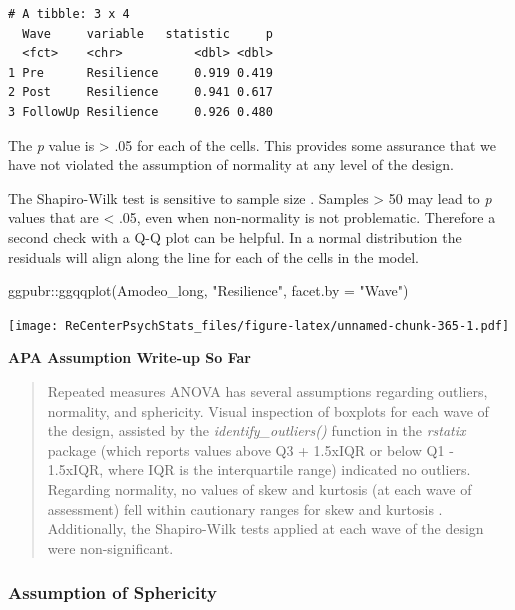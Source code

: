 \documentclass[
  11pt,
]{book}
\newenvironment{Shaded}{\begin{snugshade}}{\end{snugshade}}
\newcommand{\AttributeTok}[1]{\textcolor[rgb]{0.77,0.63,0.00}{#1}}
\newcommand{\FunctionTok}[1]{\textcolor[rgb]{0.00,0.00,0.00}{#1}}
\newcommand{\NormalTok}[1]{#1}
\newcommand{\SpecialCharTok}[1]{\textcolor[rgb]{0.00,0.00,0.00}{#1}}
\newcommand{\StringTok}[1]{\textcolor[rgb]{0.31,0.60,0.02}{#1}}
\begin{document}
\begin{verbatim}
# A tibble: 3 x 4
  Wave     variable   statistic     p
  <fct>    <chr>          <dbl> <dbl>
1 Pre      Resilience     0.919 0.419
2 Post     Resilience     0.941 0.617
3 FollowUp Resilience     0.926 0.480
\end{verbatim}

The \emph{p} value is \textgreater{} .05 for each of the cells. This provides some assurance that we have not violated the assumption of normality at any level of the design.

The Shapiro-Wilk test is sensitive to sample size \citep{datanovia_repeated_nodate}. Samples \textgreater{} 50 may lead to \emph{p} values that are \textless{} .05, even when non-normality is not problematic. Therefore a second check with a Q-Q plot can be helpful. In a normal distribution the residuals will align along the line for each of the cells in the model.

\begin{Shaded}
\begin{Highlighting}[]
\NormalTok{ggpubr}\SpecialCharTok{::}\FunctionTok{ggqqplot}\NormalTok{(Amodeo\_long, }\StringTok{"Resilience"}\NormalTok{, }\AttributeTok{facet.by =} \StringTok{"Wave"}\NormalTok{)}
\end{Highlighting}
\end{Shaded}

\texttt{[image: ReCenterPsychStats\_files/figure-latex/unnamed-chunk-365-1.pdf]}

\textbf{APA Assumption Write-up So Far}

\begin{quote}
Repeated measures ANOVA has several assumptions regarding outliers, normality, and sphericity. Visual inspection of boxplots for each wave of the design, assisted by the \emph{identify\_outliers()} function in the \emph{rstatix} package (which reports values above Q3 + 1.5xIQR or below Q1 - 1.5xIQR, where IQR is the interquartile range) indicated no outliers. Regarding normality, no values of skew and kurtosis (at each wave of assessment) fell within cautionary ranges for skew and kurtosis \citep{kline_principles_2016}. Additionally, the Shapiro-Wilk tests applied at each wave of the design were non-significant.
\end{quote}

\hypertarget{assumption-of-sphericity}{%
\subsubsection{Assumption of Sphericity}\label{assumption-of-sphericity}}
\end{document}
